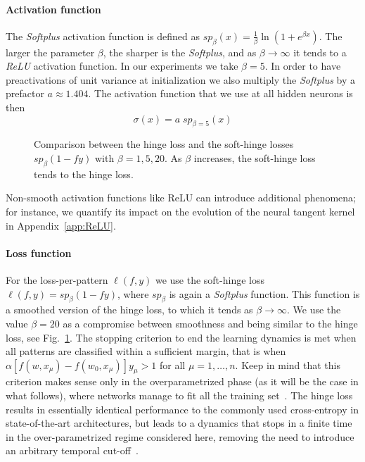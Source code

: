 \documentclass{article}
\renewcommand{\cite}[1]{\citep{#1}}
\newcommand{\aref}[1]{Appendix~\ref{#1}}
\newcommand{\fref}[1]{Fig.~\ref{#1}}
\begin{document}
\paragraph{Activation function}
The \textit{Softplus} activation function is defined as $\mathit{sp}_\beta(x) = \frac{1}{\beta} \ln(1 + e^{\beta x})$. The larger the parameter $\beta$, the sharper is the \textit{Softplus}, and as $\beta\to\infty$ it tends to a \emph{ReLU} activation function. In our experiments we take $\beta=5$.
In order to have preactivations of unit variance at initialization we also multiply the \textit{Softplus} by a prefactor $a \approx 1.404$. The activation function that we use at all hidden neurons is then
\begin{equation}
\sigma(x) = a \; \mathit{sp}_{\beta=5}(x)
\end{equation}


\begin{figure}
 \centering
 \vspace{-0.75cm}
 \hspace{-0.8cm}\vspace{-0.6cm}
 \caption{Comparison between the hinge loss and the soft-hinge losses $\mathit{sp}_\beta(1 - fy)$ with $\beta=1, 5, 20$. As $\beta$ increases, the soft-hinge loss tends to the hinge loss.}
 \label{fig:loss}
\end{figure}

Non-smooth activation functions like ReLU can introduce additional phenomena; for instance, we quantify its impact on the evolution of the neural tangent kernel in \aref{app:ReLU}.

\paragraph{Loss function}
For the loss-per-pattern $\ell(f, y)$  we use the soft-hinge loss $\ell(f, y) = \mathit{sp}_\beta(1 - fy)$, where $\mathit{sp_\beta}$ is again a \textit{Softplus} function. This function is a smoothed version of the hinge loss, to which it tends as $\beta \to \infty$. We use the value $\beta=20$ as a compromise between smoothness and being similar to the hinge loss, see \fref{fig:loss}. The stopping criterion to end the learning dynamics is met when all patterns are classified within a sufficient margin, that is when $\alpha \left[f(w, x_\mu) - f(w_0, x_\mu)\right] y_\mu > 1$ for all $\mu=1,\dots, n$. Keep in mind that this criterion makes sense only in the overparametrized phase (as it will be the case in what follows), where networks manage to fit all the training set~\cite{Spigler18}.
The hinge loss results in essentially identical performance to the commonly used cross-entropy in state-of-the-art architectures, but leads to a dynamics that stops in a finite time in the over-parametrized regime considered here, removing the need to introduce an arbitrary temporal cut-off~\cite{Spigler18}.
\end{document}
